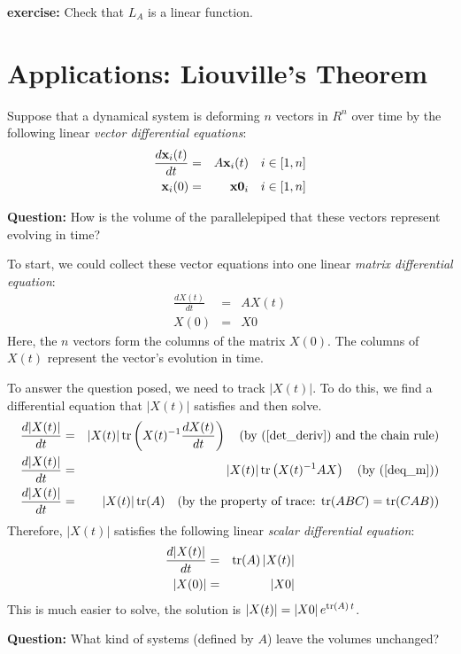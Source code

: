 \documentclass{article}
\begin{document}
{\bf exercise:} Check that $L_A$ is a linear function.

\section{Applications: Liouville's Theorem}
Suppose that a dynamical system is deforming $n$ vectors in $R^n$ over time by
the following linear {\em vector differential equations\/}:
\begin{eqnarray}
  \frac{d {\bf x}_i(t)}{dt} & = & A {\bf x}_i(t) \quad i \in [1, n] \label{deq_v}\\
  {\bf x}_i(0) & = & {\bf x0}_i \quad i \in [1,n]
\end{eqnarray}

{\bf Question:\/} How is the volume of the parallelepiped that these vectors represent
evolving in time?

To start, we could collect these vector equations into one linear
{\em matrix differential equation\/}:
\begin{eqnarray}
  \frac{d X(t)}{dt} & = & A X(t) \label{deq_m}\\
  X(0) & = & X0
\end{eqnarray}
Here, the $n$ vectors form the columns of the matrix $X(0)$. The columns of
$X(t)$ represent the vector's evolution in time.

To answer the question posed, 
we need to track $|X(t)|$. To do this, we find a differential equation
that $|X(t)|$ satisfies and then solve.
\begin{eqnarray*}
  \frac{d |X(t)|}{dt} & = & |X(t)| \, {\rm tr}\left(X(t)^{-1} \frac{d X(t)}{dt}\right)
  \quad \text{(by $(\ref{det_deriv})$ and the chain rule)} \\
  \frac{d |X(t)|}{dt} & = & |X(t)| \, {\rm tr}\left(X(t)^{-1} A X\right) \quad
  \text{(by $(\ref{deq_m})$)} \\
  \frac{d |X(t)|}{dt} & = & |X(t)| \, {\rm tr}(A) \quad
  \text{(by the property of trace: ${\rm tr}(ABC) = {\rm tr}(CAB)$)}
\end{eqnarray*}
Therefore, $|X(t)|$ satisfies the following linear {\em scalar differential equation\/}:
\begin{eqnarray}
  \frac{d |X(t)|}{dt} & = & {\rm tr}(A) \, |X(t)| \\
  |X(0)| & = & |X0|
\end{eqnarray}
This is much easier to solve, the solution is $|X(t)| = |X0| \, e^{{\rm tr}(A)\, t}$.

{\bf Question:\/} What kind of systems (defined by $A$) leave the volumes unchanged?
\end{document}
